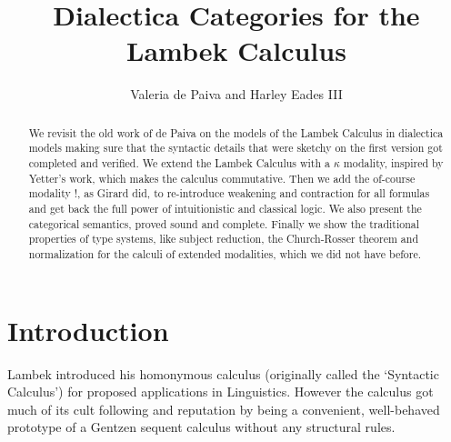 \documentclass{llncs}
\begin{document}
\title{Dialectica Categories for the Lambek Calculus}

\author{Valeria de Paiva and Harley Eades III}


\maketitle

\begin{abstract}
  We revisit the old work of de Paiva on the models of the Lambek
  Calculus in dialectica models making sure that the syntactic
  details that were sketchy on the first version got completed and
  verified.  We extend the Lambek Calculus with a $\kappa$ modality,
  inspired by Yetter's work, which makes the calculus
  commutative. Then we add the of-course modality $!$, as Girard did,
  to re-introduce weakening and contraction for all formulas and get
  back the full power of intuitionistic and classical logic. We also
  present the categorical semantics, proved sound and
  complete. Finally we show the traditional properties of type
  systems, like subject reduction, the Church-Rosser theorem and
  normalization for the calculi of extended modalities, which we did
  not have before.
\end{abstract}


\section*{Introduction}
Lambek introduced his homonymous calculus (originally called the
`Syntactic Calculus') for proposed applications in Linguistics.
However the calculus got much of its cult following and reputation by
being a convenient, well-behaved prototype of a Gentzen sequent
calculus without any structural rules.
\end{document}
